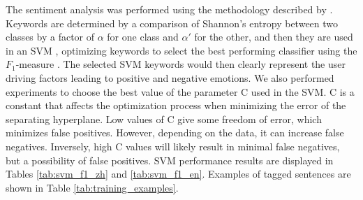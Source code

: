 \documentclass[smallextended,natbib]{svjour3}       %
\begin{document}
    The sentiment analysis was performed using the methodology described by \cite{Aleman2018ICAROB}. Keywords are determined by a comparison of Shannon's entropy \cite[][]{shannon1948} between two classes by a factor of \(\alpha\) for one class and \(\alpha'\) for the other, and then they are used in an SVM \cite[][]{cortes1995}, optimizing keywords to select the best performing classifier using the \(F_1\)-measure \cite[][]{powers2011}. The selected SVM keywords would then clearly represent the user driving factors leading to positive and negative emotions. We also performed experiments to choose the best value of the parameter C used in the SVM. C is a constant that affects the optimization process when minimizing the error of the separating hyperplane. Low values of C give some freedom of error, which minimizes false positives. However, depending on the data, it can increase false negatives. Inversely, high C values will likely result in minimal false negatives, but a possibility of false positives. SVM performance results are displayed in  Tables \ref{tab:svm_f1_zh} and \ref{tab:svm_f1_en}. Examples of tagged sentences are shown in Table \ref{tab:training_examples}. 
\end{document}
